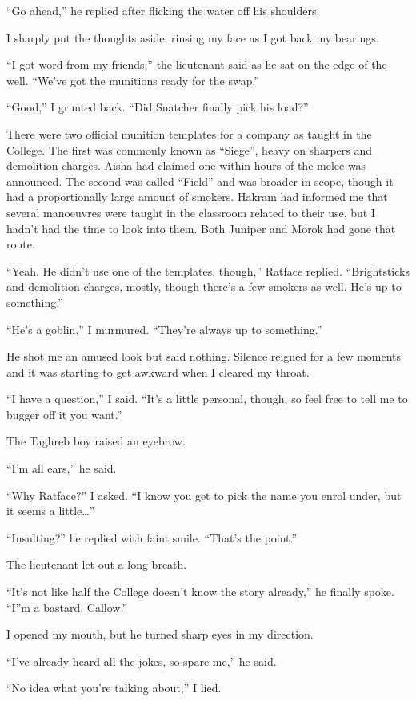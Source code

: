 \documentclass[12pt, openany]{book}
\begin{document}
“Go ahead,” he replied after flicking the water off his shoulders.

I sharply put the thoughts aside, rinsing my face as I got back my bearings. 

“I got word from my friends,” the lieutenant said as he sat on the edge of the well. “We’ve got the munitions ready for the swap.”

“Good,” I grunted back. “Did Snatcher finally pick his load?”

There were two official munition templates for a company as taught in the College. The first was commonly known as “Siege”, heavy on sharpers and demolition charges. Aisha had claimed one within hours of the melee was announced. The second was called “Field” and was broader in scope, though it had a proportionally large amount of smokers. Hakram had informed me that several manoeuvres were taught in the classroom related to their use, but I hadn’t had the time to look into them. Both Juniper and Morok had gone that route.

“Yeah. He didn’t use one of the templates, though,” Ratface replied. “Brightsticks and demolition charges, mostly, though there’s a few smokers as well. He’s up to something.”

“He’s a goblin,” I murmured. “They’re always up to something.”

He shot me an amused look but said nothing. Silence reigned for a few moments and it was starting to get awkward when I cleared my throat.

“I have a question,” I said. “It’s a little personal, though, so feel free to tell me to bugger off it you want.”

The Taghreb boy raised an eyebrow.

“I’m all ears,” he said.

“Why Ratface?” I asked. “I know you get to pick the name you enrol under, but it seems a little…”

“Insulting?” he replied with faint smile. “That’s the point.”

The lieutenant let out a long breath.

“It’s not like half the College doesn’t know the story already,” he finally spoke. “I”m a bastard, Callow.”

I opened my mouth, but he turned sharp eyes in my direction.

“I’ve already heard all the jokes, so spare me,” he said.

“No idea what you’re talking about,” I lied.
\end{document}
